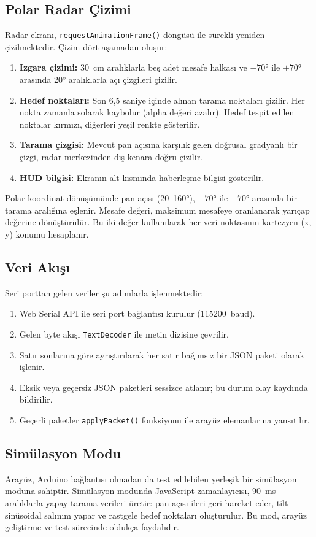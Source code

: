 \subsection{Polar Radar Çizimi}

Radar ekranı, \texttt{requestAnimationFrame()} döngüsü ile sürekli yeniden çizilmektedir. Çizim dört aşamadan oluşur:

\begin{enumerate}
    \item \textbf{Izgara çizimi:} 30~cm aralıklarla beş adet mesafe halkası ve $-70$° ile $+70$° arasında 20° aralıklarla açı çizgileri çizilir.
    \item \textbf{Hedef noktaları:} Son 6,5 saniye içinde alınan tarama noktaları çizilir. Her nokta zamanla solarak kaybolur (alpha değeri azalır). Hedef tespit edilen noktalar kırmızı, diğerleri yeşil renkte gösterilir.
    \item \textbf{Tarama çizgisi:} Mevcut pan açısına karşılık gelen doğrusal gradyanlı bir çizgi, radar merkezinden dış kenara doğru çizilir.
    \item \textbf{HUD bilgisi:} Ekranın alt kısmında haberleşme bilgisi gösterilir.
\end{enumerate}

Polar koordinat dönüşümünde pan açısı (20--160°), $-70$° ile $+70$° arasında bir tarama aralığına eşlenir. Mesafe değeri, maksimum mesafeye oranlanarak yarıçap değerine dönüştürülür. Bu iki değer kullanılarak her veri noktasının kartezyen (x, y) konumu hesaplanır.

\subsection{Veri Akışı}

Seri porttan gelen veriler şu adımlarla işlenmektedir:

\begin{enumerate}
    \item Web Serial API ile seri port bağlantısı kurulur (115200~baud).
    \item Gelen byte akışı \texttt{TextDecoder} ile metin dizisine çevrilir.
    \item Satır sonlarına göre ayrıştırılarak her satır bağımsız bir JSON paketi olarak işlenir.
    \item Eksik veya geçersiz JSON paketleri sessizce atlanır; bu durum olay kaydında bildirilir.
    \item Geçerli paketler \texttt{applyPacket()} fonksiyonu ile arayüz elemanlarına yansıtılır.
\end{enumerate}

\subsection{Simülasyon Modu}

Arayüz, Arduino bağlantısı olmadan da test edilebilen yerleşik bir simülasyon moduna sahiptir. Simülasyon modunda JavaScript zamanlayıcısı, 90~ms aralıklarla yapay tarama verileri üretir: pan açısı ileri-geri hareket eder, tilt sinüsoidal salınım yapar ve rastgele hedef noktaları oluşturulur. Bu mod, arayüz geliştirme ve test sürecinde oldukça faydalıdır.
